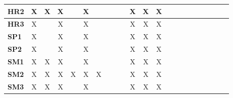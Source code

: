 \documentclass[12pt]{article}
\begin{document}
\begin{table}[H]
\begin{adjustwidth}{-0.8in}{-1.2in}
{\begin{tabular}{c|c|c|c|c|c|c|c|c|c|c|c|c|c|c|c|c|c|c|c|c|c}
\multicolumn{1}{|l|}{\textbf{HR2}}   &      X       &       X      &       X      &              &       X      &              &              &              &              &      X       &       X      &       X      &              &              &             &              &             &             &             &             \\ \hline
\multicolumn{1}{|l|}{\textbf{HR3}}   &      X       &              &       X      &              &       X      &              &              &              &              &     X        &       X      &       X      &              &              &             &              &             &             &             &             \\ \hline
\multicolumn{1}{|l|}{\textbf{SP1}}   &      X       &              &       X      &              &       X      &              &              &              &              &      X       &       X      &       X      &              &              &             &              &             &             &             &             \\ \hline
\multicolumn{1}{|l|}{\textbf{SP2}}   &      X       &              &       X      &              &       X      &              &              &              &              &      X       &       X      &       X      &              &              &             &              &             &             &             &             \\ \hline
\multicolumn{1}{|l|}{\textbf{SM1}}   &      X       &       X      &       X      &              &       X      &              &              &              &              &      X       &       X      &       X      &              &              &             &              &             &             &             &             \\ \hline
\multicolumn{1}{|l|}{\textbf{SM2}}   &      X       &       X      &       X      &       X      &       X      &       X      &              &              &              &       X      &       X      &       X      &              &              &             &              &             &             &             &             \\ \hline
\multicolumn{1}{|l|}{\textbf{SM3}}   &      X       &       X      &       X      &              &       X      &              &              &              &              &      X       &       X      &       X      &              &              &             &              &             &             &             &             \\ \hline

\end{tabular}}
\end{adjustwidth}
\end{table}
\end{document}
